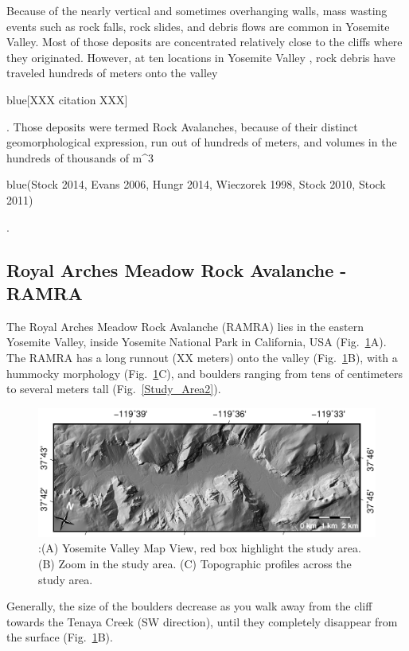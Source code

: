 \documentclass[5p]{elsarticle}
\newcommand{\COMON}{\begin{color}{blue}}
\newcommand{\COMOFF}{\end{color}}
\begin{document}
Because of  the nearly vertical and sometimes overhanging walls, mass wasting events such as rock falls, rock slides, and debris flows are common in Yosemite Valley. Most of those deposits are concentrated relatively close to the cliffs where they originated. However, at ten locations in Yosemite Valley , rock debris have traveled hundreds of meters onto the valley \COMON[XXX citation XXX]\COMOFF. Those deposits were termed Rock Avalanches, because of their distinct geomorphological expression, run out of hundreds of meters, and volumes in the hundreds of thousands of m^3 \COMON(Stock 2014, Evans 2006,  Hungr 2014, Wieczorek 1998, Stock 2010, Stock 2011)\COMOFF. 
\bigskip


   
    
\subsection{Royal Arches Meadow Rock Avalanche - RAMRA}

The Royal Arches Meadow Rock Avalanche (RAMRA) lies in the eastern Yosemite Valley, inside Yosemite National Park in California, USA (Fig.~\ref{Study_Area}A). The RAMRA has a long runnout (XX meters) onto the valley (Fig.~\ref{Study_Area}B), with a hummocky morphology (Fig.~\ref{Study_Area}C), and boulders ranging from tens of centimeters to several meters tall (Fig.~\ref{Study_Area2}).


								   \begin{figure}[h]

	\includegraphics[width=\textwidth]{Yosemite.pdf}
		\caption{:(A) Yosemite Valley Map View, red box highlight the study area. (B) Zoom in the study area. (C) Topographic profiles across the study area.  \label{Study_Area}}

								   \end{figure}




Generally, the size of the boulders decrease as you walk away from the cliff towards the Tenaya Creek (SW direction), until they completely disappear from the surface (Fig.~\ref{Study_Area}B).  
\end{document}
